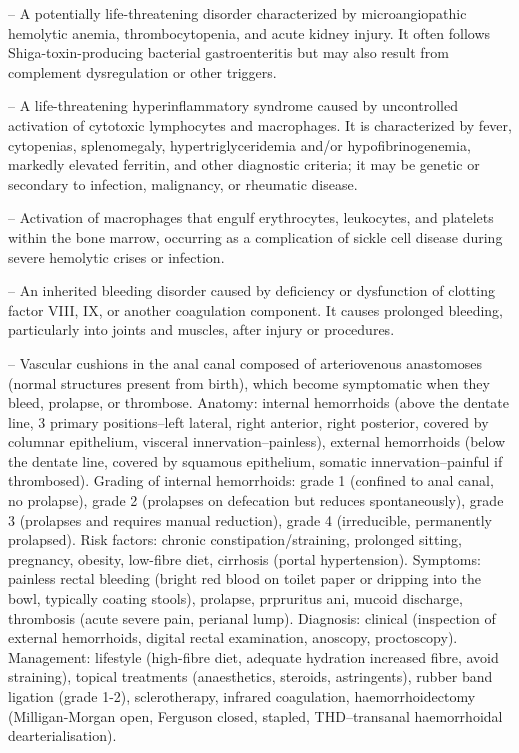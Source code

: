 -- A potentially life-threatening disorder characterized by microangiopathic hemolytic anemia, thrombocytopenia, and acute kidney injury. It often follows Shiga-toxin-producing bacterial gastroenteritis but may also result from complement dysregulation or other triggers.

-- A life-threatening hyperinflammatory syndrome caused by uncontrolled activation of cytotoxic lymphocytes and macrophages. It is characterized by fever, cytopenias, splenomegaly, hypertriglyceridemia and/or hypofibrinogenemia, markedly elevated ferritin, and other diagnostic criteria; it may be genetic or secondary to infection, malignancy, or rheumatic disease.

-- Activation of macrophages that engulf erythrocytes, leukocytes, and platelets within the bone marrow, occurring as a complication of sickle cell disease during severe hemolytic crises or infection.

-- An inherited bleeding disorder caused by deficiency or dysfunction of clotting factor VIII, IX, or another coagulation component. It causes prolonged bleeding, particularly into joints and muscles, after injury or procedures.

-- Vascular cushions in the anal canal composed of arteriovenous anastomoses (normal structures present from birth), which become symptomatic when they bleed, prolapse, or thrombose. Anatomy: internal hemorrhoids (above the dentate line, 3 primary positions--left lateral, right anterior, right posterior, covered by columnar epithelium, visceral innervation--painless), external hemorrhoids (below the dentate line, covered by squamous epithelium, somatic innervation--painful if thrombosed). Grading of internal hemorrhoids: grade 1 (confined to anal canal, no prolapse), grade 2 (prolapses on defecation but reduces spontaneously), grade 3 (prolapses and requires manual reduction), grade 4 (irreducible, permanently prolapsed). Risk factors: chronic constipation/straining, prolonged sitting, pregnancy, obesity, low-fibre diet, cirrhosis (portal hypertension). Symptoms: painless rectal bleeding (bright red blood on toilet paper or dripping into the bowl, typically coating stools), prolapse, prpruritus ani, mucoid discharge, thrombosis (acute severe pain, perianal lump). Diagnosis: clinical (inspection of external hemorrhoids, digital rectal examination, anoscopy, proctoscopy). Management: lifestyle (high-fibre diet, adequate hydration increased fibre, avoid straining), topical treatments (anaesthetics, steroids, astringents), rubber band ligation (grade 1-2), sclerotherapy, infrared coagulation, haemorrhoidectomy (Milligan-Morgan open, Ferguson closed, stapled, THD--transanal haemorrhoidal dearterialisation).


